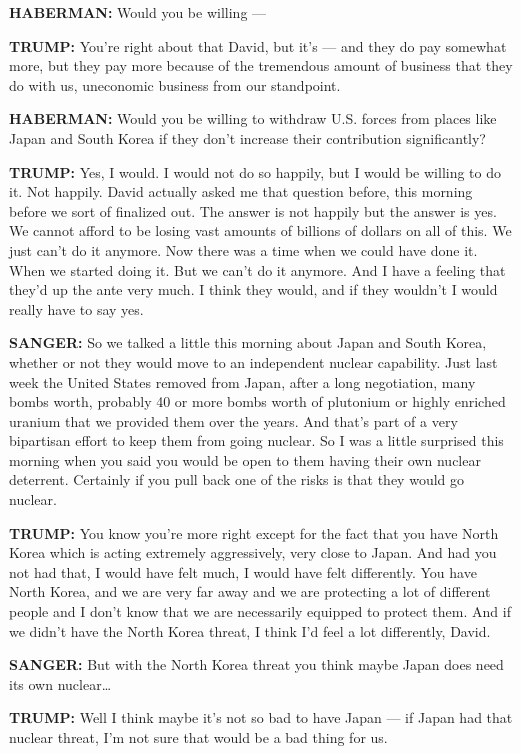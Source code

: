 \textbf{HABERMAN:} Would you be willing ---

\textbf{TRUMP:} You're right about that David, but it's --- and they do
pay somewhat more, but they pay more because of the tremendous amount of
business that they do with us, uneconomic business from our standpoint.

\textbf{HABERMAN:} Would you be willing to withdraw U.S. forces from
places like Japan and South Korea if they don't increase their
contribution significantly?

\textbf{TRUMP:} Yes, I would. I would not do so happily, but I would be
willing to do it. Not happily. David actually asked me that question
before, this morning before we sort of finalized out. The answer is not
happily but the answer is yes. We cannot afford to be losing vast
amounts of billions of dollars on all of this. We just can't do it
anymore. Now there was a time when we could have done it. When we
started doing it. But we can't do it anymore. And I have a feeling that
they'd up the ante very much. I think they would, and if they wouldn't I
would really have to say yes.

\textbf{SANGER:} So we talked a little this morning about Japan and
South Korea, whether or not they would move to an independent nuclear
capability. Just last week the United States removed from Japan, after a
long negotiation, many bombs worth, probably 40 or more bombs worth of
plutonium or highly enriched uranium that we provided them over the
years. And that's part of a very bipartisan effort to keep them from
going nuclear. So I was a little surprised this morning when you said
you would be open to them having their own nuclear deterrent. Certainly
if you pull back one of the risks is that they would go nuclear.

\textbf{TRUMP:} You know you're more right except for the fact that you
have North Korea which is acting extremely aggressively, very close to
Japan. And had you not had that, I would have felt much, I would have
felt differently. You have North Korea, and we are very far away and we
are protecting a lot of different people and I don't know that we are
necessarily equipped to protect them. And if we didn't have the North
Korea threat, I think I'd feel a lot differently, David.

\textbf{SANGER:} But with the North Korea threat you think maybe Japan
does need its own nuclear\ldots{}

\textbf{TRUMP:} Well I think maybe it's not so bad to have Japan --- if
Japan had that nuclear threat, I'm not sure that would be a bad thing
for us.


